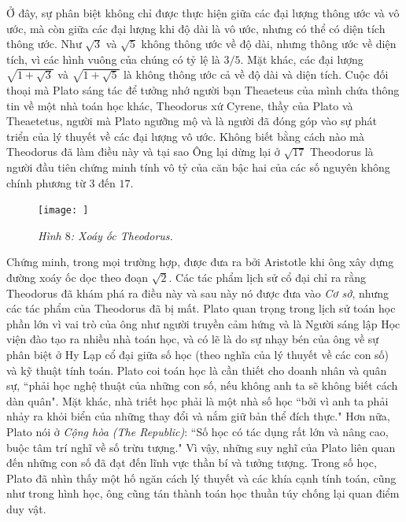 \begin{multicols}{2}
	\vskip 0.1cm
	Ở đây, sự phân biệt không chỉ được thực hiện giữa các đại lượng thông ước và vô ước, mà còn giữa các đại lượng khi độ dài là vô ước, nhưng có thể có diện tích thông ước. Như $\sqrt{3}$  và $\sqrt{5}$  không thông ước về độ dài, nhưng thông ước về diện tích, vì các hình vuông của chúng có tỷ lệ là $3/5$.
	\vskip 0.1cm
	Mặt khác, các đại lượng  $\sqrt{1 + \sqrt{3}}$  và $\sqrt{1 + \sqrt{5}}$ là không thông ước cả về độ dài và diện tích.
	\vskip 0.1cm
	Cuộc đối thoại mà Plato sáng tác để tưởng nhớ người bạn Theaeteus của mình chứa thông tin về một nhà toán học khác, Theodorus xứ Cyrene, thầy của Plato và Theaetetus, người mà Plato ngưỡng mộ và là người đã đóng góp vào sự phát triển của lý thuyết về các đại lượng vô ước. 
	\vskip 0.1cm
	Không biết bằng cách nào mà Theodorus đã làm điều này và tại sao Ông lại dừng lại ở $\sqrt{17}$ 
	\vskip 0.1cm
	Theodorus là người đầu tiên chứng minh tính vô tỷ của căn bậc hai của các số nguyên không chính phương từ $3$ đến $17$.	 
	\begin{figure}[H]
		\vspace*{-5pt}
		\centering
		\captionsetup{labelformat= empty, justification=centering}
		\texttt{[image: ]}
		\caption{\small\textit{\color{lichsutoanhoc}Hình $8$: Xoáy ốc Theodorus.}}
		\vspace*{-10pt}
	\end{figure}
	Chứng minh, trong mọi trường hợp, được đưa ra bởi Aristotle khi ông xây dựng đường xoáy ốc dọc theo đoạn $\sqrt{2}$. Các tác phẩm lịch sử cổ đại chỉ ra rằng Theodorus đã khám phá ra điều này và sau này nó được đưa vào \textit{Cơ sở}, nhưng các tác phẩm của Theodorus đã bị mất. 
	\vskip 0.1cm
	Plato quan trọng trong lịch sử toán học phần lớn vì vai trò của ông như người truyền cảm hứng và là Người sáng lập Học viện đào tạo ra nhiều nhà toán học, và có lẽ là do sự nhạy bén của ông về sự phân biệt ở Hy Lạp cổ đại giữa số học (theo nghĩa của lý thuyết về các con số) và kỹ thuật tính toán. 
	\vskip 0.1cm
	Plato coi toán học là cần thiết cho doanh nhân và quân sự, ``phải học nghệ thuật của những con số, nếu không anh ta sẽ không biết cách dàn quân".
	\vskip 0.1cm
	Mặt khác, nhà triết học phải là một nhà số học ``bởi vì anh ta phải nhảy ra khỏi biển của những thay đổi và nắm giữ bản thể đích thực." Hơn nữa, Plato nói ở \textit{Cộng hòa (The Republic)}: ``Số học có tác dụng rất lớn và nâng cao, buộc tâm trí nghĩ về số trừu tượng."  Vì vậy, những suy nghĩ của Plato liên quan đến những con số đã đạt đến lĩnh vực thần bí và tưởng tượng.
	\vskip 0.1cm 
	Trong số học, Plato đã nhìn thấy một hố ngăn cách lý thuyết và các khía cạnh tính toán, cũng như trong hình học, ông cũng tán thành toán học thuần túy chống lại quan điểm duy vật.  

\end{multicols}
